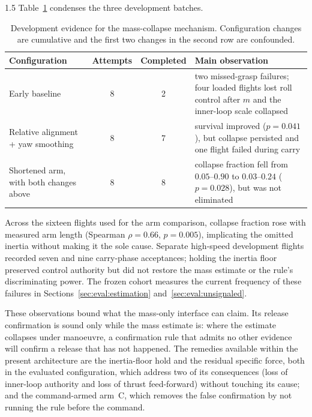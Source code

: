 \begin{spacing}{1.5}
Table~\ref{tab:collapse-development} condenses the three development batches.

\begin{table}[ht]
\centering
\caption{Development evidence for the mass-collapse mechanism. Configuration
changes are cumulative and the first two changes in the second row are
confounded.}
\label{tab:collapse-development}
\small
\begin{tabularx}{\textwidth}{@{}>{\raggedright\arraybackslash}p{} c c >{\raggedright\arraybackslash}X@{}}
\toprule
Configuration & Attempts & Completed & Main observation \\
\midrule
Early baseline & 8 & 2 & two missed-grasp failures; four loaded flights lost roll control after $\hat m$ and the inner-loop scale collapsed \\
Relative alignment + yaw smoothing & 8 & 7 & survival improved ($p=0.041$), but collapse persisted and one flight failed during carry \\
Shortened arm, with both changes above & 8 & 8 & collapse fraction fell from $0.05$--$0.90$ to $0.03$--$0.24$ ($p=0.028$), but was not eliminated \\
\bottomrule
\end{tabularx}
\end{table}

Across the sixteen flights used for the arm comparison, collapse fraction rose
with measured arm length (Spearman $\rho=0.66$, $p=0.005$), implicating the
omitted inertia without making it the sole cause. Separate high-speed
development flights recorded seven and nine carry-phase acceptances; holding the
inertia floor preserved control authority but did not restore the mass estimate
or the rule's discriminating power. The frozen cohort measures the current
frequency of these failures in Sections~\ref{sec:eval:estimation}
and~\ref{sec:eval:unsignaled}.

These observations bound what the mass-only interface can claim. Its release
confirmation is sound only while the mass estimate is: where the estimate collapses
under manoeuvre, a confirmation rule that admits no other evidence will confirm a
release that has not happened. The remedies available within the present
architecture are the inertia-floor
hold and the residual specific force, both in the evaluated configuration, which
address two of its consequences (loss of inner-loop authority and loss of thrust
feed-forward) without touching its cause; and the command-armed arm~C, which removes the false confirmation
by not running the rule before the command.


\end{spacing}
